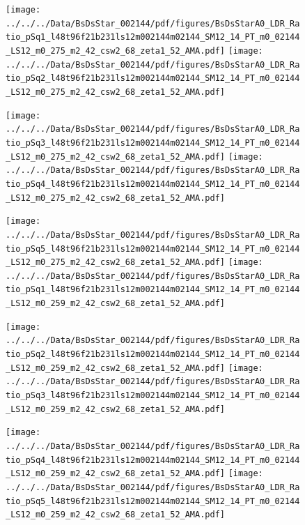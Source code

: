 \documentclass[a4paper,10pt]{article}
\begin{document}
\begin{figure}[p]
 \texttt{[image: ../../../Data/BsDsStar\_002144/pdf/figures/BsDsStarA0\_LDR\_Ratio\_pSq1\_l48t96f21b231ls12m002144m02144\_SM12\_14\_PT\_m0\_02144\_LS12\_m0\_275\_m2\_42\_csw2\_68\_zeta1\_52\_AMA.pdf]} 
 \texttt{[image: ../../../Data/BsDsStar\_002144/pdf/figures/BsDsStarA0\_LDR\_Ratio\_pSq2\_l48t96f21b231ls12m002144m02144\_SM12\_14\_PT\_m0\_02144\_LS12\_m0\_275\_m2\_42\_csw2\_68\_zeta1\_52\_AMA.pdf]} 
 \end{figure}
\begin{figure}[p]
 \texttt{[image: ../../../Data/BsDsStar\_002144/pdf/figures/BsDsStarA0\_LDR\_Ratio\_pSq3\_l48t96f21b231ls12m002144m02144\_SM12\_14\_PT\_m0\_02144\_LS12\_m0\_275\_m2\_42\_csw2\_68\_zeta1\_52\_AMA.pdf]} 
 \texttt{[image: ../../../Data/BsDsStar\_002144/pdf/figures/BsDsStarA0\_LDR\_Ratio\_pSq4\_l48t96f21b231ls12m002144m02144\_SM12\_14\_PT\_m0\_02144\_LS12\_m0\_275\_m2\_42\_csw2\_68\_zeta1\_52\_AMA.pdf]} 
 \end{figure}
\begin{figure}[p]
 \texttt{[image: ../../../Data/BsDsStar\_002144/pdf/figures/BsDsStarA0\_LDR\_Ratio\_pSq5\_l48t96f21b231ls12m002144m02144\_SM12\_14\_PT\_m0\_02144\_LS12\_m0\_275\_m2\_42\_csw2\_68\_zeta1\_52\_AMA.pdf]} 
 \texttt{[image: ../../../Data/BsDsStar\_002144/pdf/figures/BsDsStarA0\_LDR\_Ratio\_pSq1\_l48t96f21b231ls12m002144m02144\_SM12\_14\_PT\_m0\_02144\_LS12\_m0\_259\_m2\_42\_csw2\_68\_zeta1\_52\_AMA.pdf]} 
 \end{figure}
\clearpage
\begin{figure}[p]
 \texttt{[image: ../../../Data/BsDsStar\_002144/pdf/figures/BsDsStarA0\_LDR\_Ratio\_pSq2\_l48t96f21b231ls12m002144m02144\_SM12\_14\_PT\_m0\_02144\_LS12\_m0\_259\_m2\_42\_csw2\_68\_zeta1\_52\_AMA.pdf]} 
 \texttt{[image: ../../../Data/BsDsStar\_002144/pdf/figures/BsDsStarA0\_LDR\_Ratio\_pSq3\_l48t96f21b231ls12m002144m02144\_SM12\_14\_PT\_m0\_02144\_LS12\_m0\_259\_m2\_42\_csw2\_68\_zeta1\_52\_AMA.pdf]} 
 \end{figure}
\begin{figure}[p]
 \texttt{[image: ../../../Data/BsDsStar\_002144/pdf/figures/BsDsStarA0\_LDR\_Ratio\_pSq4\_l48t96f21b231ls12m002144m02144\_SM12\_14\_PT\_m0\_02144\_LS12\_m0\_259\_m2\_42\_csw2\_68\_zeta1\_52\_AMA.pdf]} 
 \texttt{[image: ../../../Data/BsDsStar\_002144/pdf/figures/BsDsStarA0\_LDR\_Ratio\_pSq5\_l48t96f21b231ls12m002144m02144\_SM12\_14\_PT\_m0\_02144\_LS12\_m0\_259\_m2\_42\_csw2\_68\_zeta1\_52\_AMA.pdf]} 
 \end{figure}
\clearpage
\end{document}
